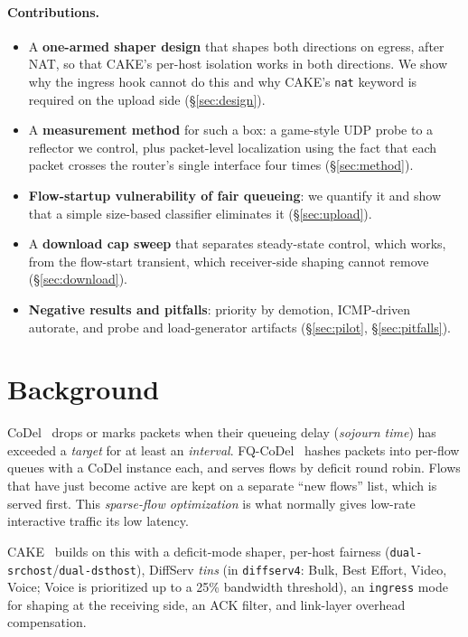 \documentclass[10pt,twocolumn]{article}
\begin{document}
\paragraph{Contributions.}
\begin{itemize}
\item A \textbf{one-armed shaper design} that shapes both directions on egress,
  after NAT, so that CAKE's per-host isolation works in both directions. We
  show why the ingress hook cannot do this and why CAKE's \texttt{nat} keyword
  is required on the upload side (\S\ref{sec:design}).
\item A \textbf{measurement method} for such a box: a game-style UDP probe to a
  reflector we control, plus packet-level localization using the fact that each
  packet crosses the router's single interface four times (\S\ref{sec:method}).
\item \textbf{Flow-startup vulnerability of fair queueing}: we quantify it and
  show that a simple size-based classifier eliminates it (\S\ref{sec:upload}).
\item A \textbf{download cap sweep} that separates steady-state control, which
  works, from the flow-start transient, which receiver-side shaping cannot
  remove (\S\ref{sec:download}).
\item \textbf{Negative results and pitfalls}: priority by demotion, ICMP-driven
  autorate, and probe and load-generator artifacts (\S\ref{sec:pilot},
  \S\ref{sec:pitfalls}).
\end{itemize}

\section{Background}
CoDel~\cite{codel,rfc8289} drops or marks packets when their queueing delay
(\emph{sojourn time}) has exceeded a \emph{target} for at least an
\emph{interval}. FQ-CoDel~\cite{rfc8290} hashes packets into per-flow queues
with a CoDel instance each, and serves flows by deficit round robin. Flows that
have just become active are kept on a separate ``new flows'' list, which is
served first. This \emph{sparse-flow optimization} is what normally gives
low-rate interactive traffic its low latency.

CAKE~\cite{cake} builds on this with a deficit-mode shaper, per-host fairness
(\texttt{dual-srchost}/\texttt{dual-dsthost}), DiffServ \emph{tins} (in
\texttt{diffserv4}: Bulk, Best Effort, Video, Voice; Voice is prioritized up to
a 25\% bandwidth threshold), an \texttt{ingress} mode for shaping at the
receiving side, an ACK filter, and link-layer overhead compensation.
\end{document}
